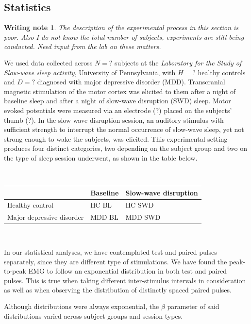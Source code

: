 \documentclass{article}
\newtheorem{wrnote}{Writing note}
\begin{document}
\begin{multicols}{2}
\section{Statistics}

\begin{wrnote}
    The description of the experimental process in this section is poor. Also I
    do not know the total number of subjects, experiments are still being
    conducted. Need input from the lab on these matters.
\end{wrnote}

We used data collected across $N = ?$ subjects at the \textit{Laboratory for the
Study of Slow-wave sleep activity}, University of Pennsylvania, with $H = ?$
healthy controls and $D = ?$ diagnosed with major depressive disorder (MDD).
Transcranial magnetic stimulation of the motor cortex was elicited to them after
a night of baseline sleep and after a night of slow-wave disruption (SWD) sleep.
Motor evoked potentials were measured via an electrode (?) placed on the
subjects' thumb (?). In the slow-wave disruption session, an auditory stimulus with
sufficient strength to interrupt the normal occurrence of slow-wave sleep, yet
not strong enough to wake the subjects, was elicited. This experimental setting
produces four distinct categories, two depending on the subject group and two on
the type of sleep session underwent, as shown in the table below.

~

\begin{tabular}{ |p{2cm}|p{2cm}|p{2cm}|  }
\hline
& Baseline & Slow-wave disruption \\
\hline
Healthy control & HC BL & HC SWD \\
\hline
Major depressive disorder & MDD BL & MDD SWD \\
\hline
\end{tabular}

~


In our statistical analyses, we have contemplated test and paired pulses
separately, since they are different type of stimulations. We have found the
peak-to-peak EMG to follow an exponential distribution in both test and paired
pulses. This is true when taking different inter-stimulus intervals in
consideration as well as when observing the distribution of distinctly spaced
paired pulses. 

Although distributions were always exponential, the $\beta$ parameter of said
distributions varied across subject groups and session types. 


\end{multicols}
\end{document}
